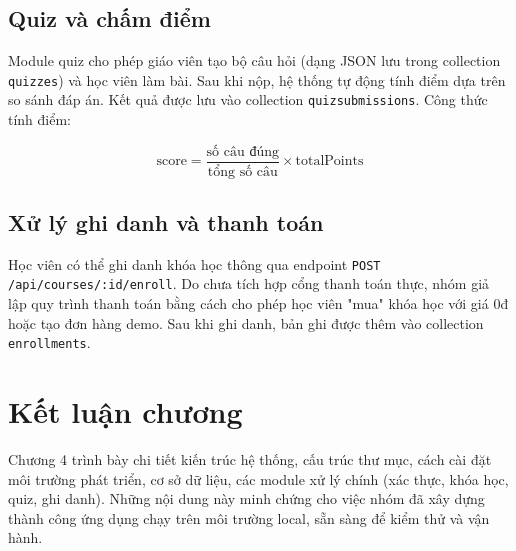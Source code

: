 \subsection{Quiz và chấm điểm}
Module quiz cho phép giáo viên tạo bộ câu hỏi (dạng JSON lưu trong collection \texttt{quizzes}) và học viên làm bài. Sau khi nộp, hệ thống tự động tính điểm dựa trên so sánh đáp án. Kết quả được lưu vào collection \texttt{quizsubmissions}. Công thức tính điểm:

\[
\text{score} = \frac{\text{số câu đúng}}{\text{tổng số câu}} \times \text{totalPoints}
\]

\subsection{Xử lý ghi danh và thanh toán}
Học viên có thể ghi danh khóa học thông qua endpoint \texttt{POST /api/courses/:id/enroll}. Do chưa tích hợp cổng thanh toán thực, nhóm giả lập quy trình thanh toán bằng cách cho phép học viên "mua" khóa học với giá 0đ hoặc tạo đơn hàng demo. Sau khi ghi danh, bản ghi được thêm vào collection \texttt{enrollments}.

\section{Kết luận chương}
Chương 4 trình bày chi tiết kiến trúc hệ thống, cấu trúc thư mục, cách cài đặt môi trường phát triển, cơ sở dữ liệu, các module xử lý chính (xác thực, khóa học, quiz, ghi danh). Những nội dung này minh chứng cho việc nhóm đã xây dựng thành công ứng dụng chạy trên môi trường local, sẵn sàng để kiểm thử và vận hành.
